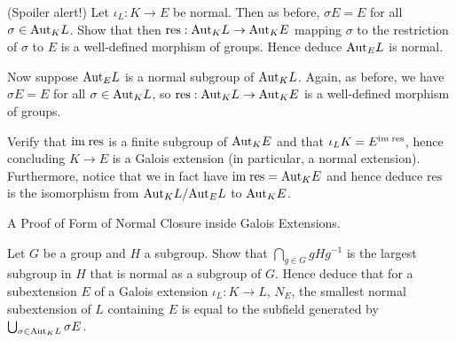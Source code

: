\documentclass[../book.tex]{subfiles}
\begin{document}
\begin{ex} (Spoiler alert!)
    Let $\iota_L : K \to E$ be normal.
    Then as before, $\sigma E = E$ for all $\sigma \in \mathrm{Aut}_{K}L$.
    Show that then $\mathrm{res} : \mathrm{Aut}_{K}L \to \mathrm{Aut}_{K}E$
    mapping $\sigma$ to the restriction of $\sigma$ to $E$ 
    is a well-defined morphism of groups.
    Hence deduce $\mathrm{Aut}_{E}L$ is normal. 

    Now suppose $\mathrm{Aut}_{E}L$ is a normal subgroup of $\mathrm{Aut}_{K}L$.
    Again, as before, we have $\sigma E = E$ for all $\sigma \in \mathrm{Aut}_{K}L$,
    so $\mathrm{res} : \mathrm{Aut}_{K}L \to \mathrm{Aut}_{K}E$ is a well-defined morphism of groups.
    
    Verify that $\textnormal{im}\;\mathrm{res}$ is a finite subgroup of $\mathrm{Aut}_{K}E$
    and that $\iota_L K = E^{\textnormal{im}\; \mathrm{res}}$,
    hence concluding $K \to E$ is a Galois extension
    (in particular, a normal extension).
    Furthermore, notice that we in fact have $\textnormal{im}\;\mathrm{res} = \mathrm{Aut}_{K}E$
    and hence deduce $\mathrm{res}$ is the isomorphism
    from $\mathrm{Aut}_{K}L / \mathrm{Aut}_{E}L$ to $\mathrm{Aut}_{K}E$.
\end{ex}

\begin{ex} A Proof of Form of Normal Closure inside Galois Extensions.
    
    Let $G$ be a group and $H$ a subgroup. 
    Show that $\bigcap_{g \in G} g H g^{-1}$ is the largest subgroup in $H$
    that is normal as a subgroup of $G$.
    Hence deduce that for a subextension $E$ 
    of a Galois extension $\iota_L : K \to L$, 
    $N_E$, the smallest normal subextension of $L$ containing $E$ 
    is equal to the subfield generated by $\bigcup_{\sigma \in \mathrm{Aut}_{K}L} \sigma E$. 
    
\end{ex}
\end{document}
